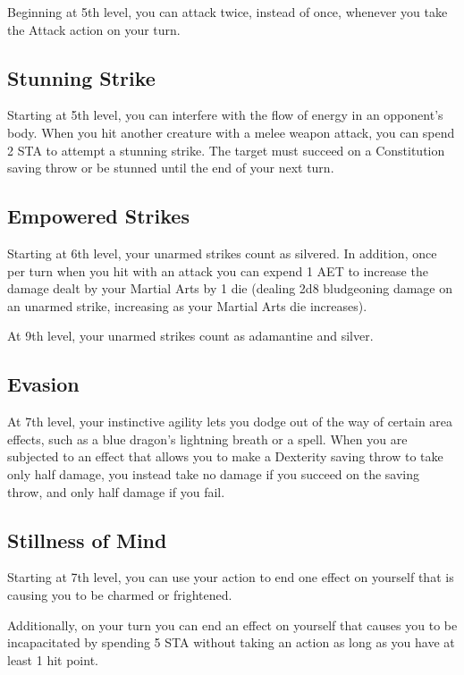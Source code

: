 Beginning at 5th level, you can attack twice, instead of once, whenever you take the Attack action on your turn.

\subsection{Stunning Strike}

Starting at 5th level, you can interfere with the flow of energy in an opponent's body. When you hit another creature with a melee weapon attack, you can spend 2 STA to attempt a stunning strike. The target must succeed on a Constitution saving throw or be stunned until the end of your next turn.

\subsection{Empowered Strikes}

Starting at 6th level, your unarmed strikes count as silvered. In addition, once per turn when you hit with an attack you can expend 1 AET to increase the damage dealt by your Martial Arts by 1 die (dealing 2d8 bludgeoning damage on an unarmed strike, increasing as your Martial Arts die increases).

At 9th level, your unarmed strikes count as adamantine and silver.

\subsection{Evasion}

At 7th level, your instinctive agility lets you dodge out of the way of certain area effects, such as a blue dragon's lightning breath or a  spell. When you are subjected to an effect that allows you to make a Dexterity saving throw to take only half damage, you instead take no damage if you succeed on the saving throw, and only half damage if you fail.

\subsection{Stillness of Mind}

Starting at 7th level, you can use your action to end one effect on yourself that is causing you to be charmed or frightened.

Additionally, on your turn you can end an effect on yourself that causes you to be incapacitated by spending 5 STA without taking an action as long as you have at least 1 hit point.

